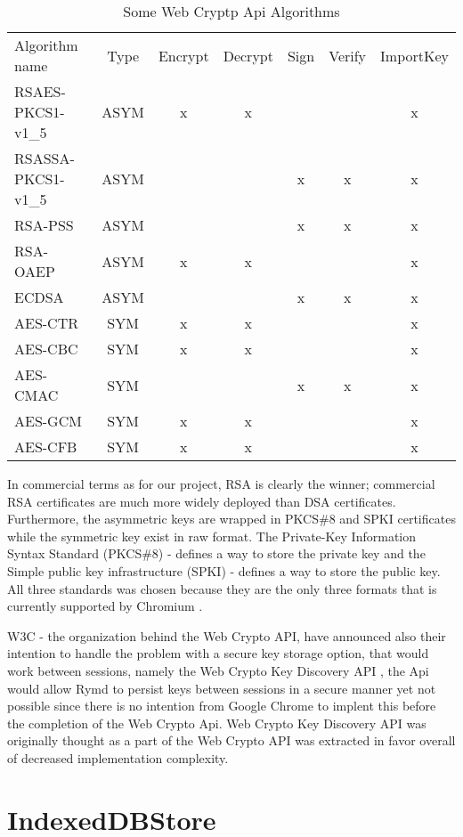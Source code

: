 \begin{table}[h]
\centering
\begin{tabular}{lcccccc}
Algorithm name & Type & Encrypt & Decrypt & Sign & Verify & ImportKey \\
RSAES-PKCS1-v1\_5 & ASYM & x & x &  &  & x \\
RSASSA-PKCS1-v1\_5 & ASYM &  &  & x & x & x \\
RSA-PSS & ASYM &  &  & x & x & x \\
RSA-OAEP & ASYM & x & x &  &  & x \\
ECDSA & ASYM &  &  & x & x & x \\
AES-CTR & SYM & x & x &  &  & x \\
AES-CBC & SYM & x & x &  &  & x \\
AES-CMAC & SYM &  &  & x & x & x \\
AES-GCM & SYM & x & x &  &  & x \\
AES-CFB & SYM & x & x &  &  & x
\end{tabular}
\caption{Some Web Cryptp Api Algorithms}
\label{table:webcrypoapi}
\end{table}
In commercial terms as for our project, RSA is clearly the winner; commercial RSA certificates are much more widely deployed than DSA certificates.
Furthermore, the asymmetric keys are wrapped in PKCS\#8 and SPKI certificates while the symmetric key exist in raw format.
The Private-Key Information Syntax Standard (PKCS\#8) -  defines a way to store the private key and the Simple public key infrastructure (SPKI) - defines a way to store the public key.
All three standards was chosen because they are the only three formats that is currently supported by Chromium \cite{ImplementedChromium:Online}.

W3C - the organization behind the Web Crypto API, have announced also their intention to handle the problem with a secure key storage option, that would work between sessions, namely the Web Crypto Key Discovery API \cite{WebCryptoKeyDiscovery:Online}, the Api would allow Rymd to persist keys between sessions in a secure manner yet not possible since there is no intention from Google Chrome to implent this before the completion of the Web Crypto Api. Web Crypto Key Discovery API was originally thought as a part of the Web Crypto API was extracted in favor overall of decreased implementation complexity.


\section{IndexedDBStore}
\label{sec:indexeddbstore}

